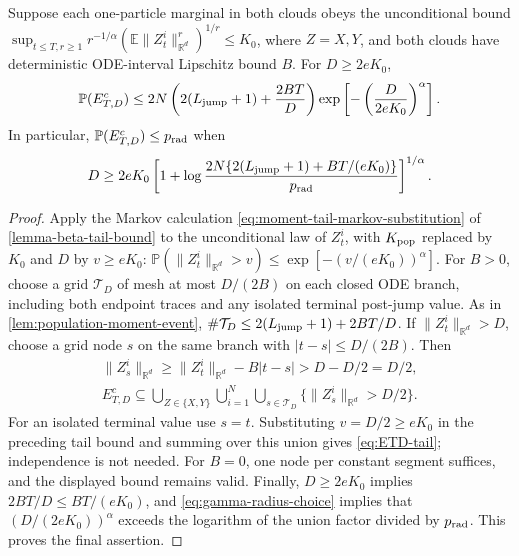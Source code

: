 \begin{lemma}
\label{lemma:uniform-radius-bound-XY}
Suppose each one-particle marginal in both clouds obeys the unconditional
bound
$\sup_{t\le T,r\ge1}r^{-1/\alpha}
(\mathbb E\|Z_t^i\|_{\mathbb R^d}^r)^{1/r}\le K_0$, where $Z=X,Y$,
and both clouds have deterministic ODE-interval Lipschitz bound $B$.
For $D\ge2eK_0$,
\begin{equation}
\label{eq:ETD-tail}
 \mathbb P(E_{T,D}^c)\le
 2N\left(2(L_{\mathrm{jump}}+1)+\frac{2BT}{D}\right)
 \exp\left[-\left(\frac{D}{2eK_0}\right)^\alpha\right].
\end{equation}
In particular, $\mathbb P(E_{T,D}^c)\le p_{\rm rad}$ when
\begin{equation}
\label{eq:gamma-radius-choice}
 D\ge2eK_0\left[
 1+\log\frac{2N\{2(L_{\mathrm{jump}}+1)+BT/(eK_0)\}}{p_{\rm rad}}
 \right]^{1/\alpha}.
\end{equation}
\end{lemma}
\begin{proof}
Apply the Markov calculation \eqref{eq:moment-tail-markov-substitution}
of \cref{lemma-beta-tail-bound} to the unconditional law of $Z_t^i$,
with $K_{\rm pop}$ replaced by $K_0$ and $D$ by $v\ge eK_0$:
$\mathbb P(\|Z_t^i\|_{\mathbb R^d}>v)\le\exp[-(v/(eK_0))^\alpha]$.
For $B>0$, choose a grid $\mathcal T_D$ of mesh at most $D/(2B)$ on each
closed ODE branch, including both endpoint traces and any isolated
terminal post-jump value. As in \cref{lem:population-moment-event},
$\#\mathcal T_D\le2(L_{\mathrm{jump}}+1)+2BT/D$.
If $\|Z_t^i\|_{\mathbb R^d}>D$, choose a grid node $s$ on the same branch with
$|t-s|\le D/(2B)$. Then
\[
\begin{gathered}
 \|Z_s^i\|_{\mathbb R^d}\ge\|Z_t^i\|_{\mathbb R^d}-B|t-s|>D-D/2=D/2,
 \\
 E_{T,D}^c\subseteq
 \bigcup_{Z\in\{X,Y\}}\bigcup_{i=1}^N\bigcup_{s\in\mathcal T_D}
       \{\|Z_s^i\|_{\mathbb R^d}>D/2\}.
\end{gathered}
\]
For an isolated terminal value use $s=t$. Substituting $v=D/2\ge eK_0$
in the preceding tail bound and summing over this union gives
\eqref{eq:ETD-tail}; independence is not needed.
For $B=0$, one node per constant segment suffices, and the displayed
bound remains valid.  Finally, $D\ge2eK_0$ implies
$2BT/D\le BT/(eK_0)$, and
\eqref{eq:gamma-radius-choice} implies that
$(D/(2eK_0))^\alpha$ exceeds the logarithm of the union factor divided
by $p_{\rm rad}$.  This proves the final assertion.
\end{proof}

